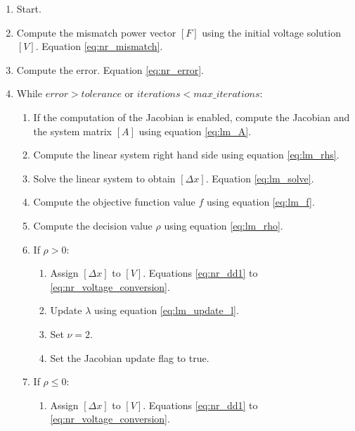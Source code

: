 \documentclass[nols,a4paper,twoside,notoc,fleqn]{tufte-book}
\begin{document}
\begin{enumerate}

\item Start.

\item Compute the mismatch power vector $[F]$ using the initial voltage solution $[V]$. Equation \ref{eq:nr_mismatch}.

\item Compute the error. Equation \ref{eq:nr_error}.

\item While $error > tolerance$ or $iterations < max\_iterations$:

	\begin{enumerate}
	\item If the computation of the Jacobian is enabled, compute the Jacobian and the system matrix $[A]$ using equation \ref{eq:lm_A}.
	
	\item Compute the linear system right hand side using equation \ref{eq:lm_rhs}.
	
	\item Solve the linear system to obtain $[\Delta x]$. Equation \ref{eq:lm_solve}.
	
	\item Compute the objective function value $f$ using equation \ref{eq:lm_f}.
	
	\item Compute the decision value $\rho$ using equation \ref{eq:lm_rho}.
	
	\item If $\rho > 0$:
	
		\begin{enumerate}
		\item Assign $[\Delta x]$ to $[V]$. Equations \ref{eq:nr_dd1} to \ref{eq:nr_voltage_conversion}.
		
		\item Update $\lambda$ using equation \ref{eq:lm_update_l}.
		
		\item Set $\nu = 2$.
		
		\item Set the Jacobian update flag to true.
		\end{enumerate}
		
	\item If $\rho \leq 0$:
	
		\begin{enumerate}
		\item Assign $[\Delta x]$ to $[V]$. Equations \ref{eq:nr_dd1} to \ref{eq:nr_voltage_conversion}.
		

\end{enumerate}
\end{enumerate}
\end{enumerate}
\end{document}
